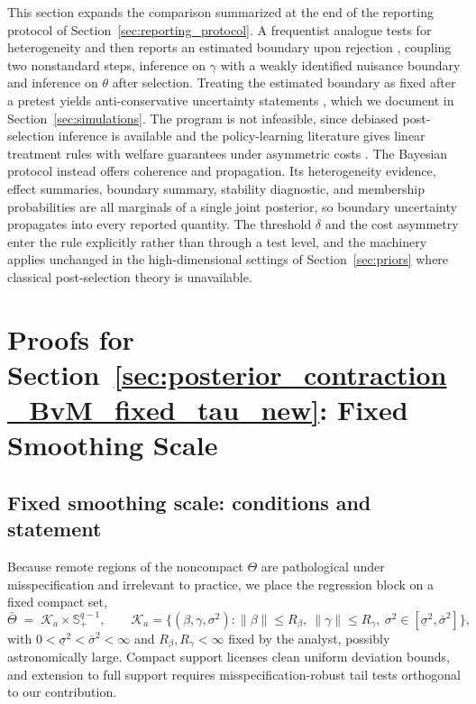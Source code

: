 \documentclass[11pt]{article}
\theoremstyle{definition}
\theoremstyle{plain}
\begin{document}
This section expands the comparison summarized at the end of the reporting protocol of Section~\ref{sec:reporting_protocol}.
A frequentist analogue tests for heterogeneity and then reports an estimated boundary upon rejection \citep[e.g.,][]{Fan2017,LeeSeoShin2011}, coupling two nonstandard steps, inference on $\gamma$ with a weakly identified nuisance boundary and inference on $\theta$ after selection. Treating the estimated boundary as fixed after a pretest yields anti-conservative uncertainty statements \citep{Kang2017}, which we document in Section~\ref{sec:simulations}. The program is not infeasible, since debiased post-selection inference is available \citep{GuoHe2021} and the policy-learning literature gives linear treatment rules with welfare guarantees under asymmetric costs \citep{KitagawaTetenov2018,AtheyWager2021,Zhao2012owl}. The Bayesian protocol instead offers coherence and propagation. Its heterogeneity evidence, effect summaries, boundary summary, stability diagnostic, and membership probabilities are all marginals of a single joint posterior, so boundary uncertainty propagates into every reported quantity. The threshold $\delta$ and the cost asymmetry enter the rule explicitly rather than through a test level, and the machinery applies unchanged in the high-dimensional settings of Section~\ref{sec:priors} where classical post-selection theory is unavailable.
\section{Proofs for Section~\ref{sec:posterior_contraction_BvM_fixed_tau_new}: Fixed Smoothing Scale}
\label{sec:proofs_fixed_tau_new}

\subsection{Fixed smoothing scale: conditions and statement}

Because remote regions of the noncompact $\Theta$ are pathological under misspecification and irrelevant to practice, we place the regression block on a fixed compact set,
\[
\bar\Theta \;=\; \mathcal K_a\times\mathbb S^{q-1}_+,
\qquad
\mathcal K_a=\big\{(\beta,\gamma,\sigma^2):\|\beta\|\le R_\beta,\ \|\gamma\|\le R_\gamma,\ \sigma^2\in[\underline\sigma^2,\overline\sigma^2]\big\},
\]
with $0<\underline\sigma^2<\overline\sigma^2<\infty$ and $R_\beta,R_\gamma<\infty$ fixed by the analyst, possibly astronomically large. Compact support licenses clean uniform deviation bounds, and extension to full support requires misspecification-robust tail tests \citep{Kleijn2006} orthogonal to our contribution.
\end{document}
